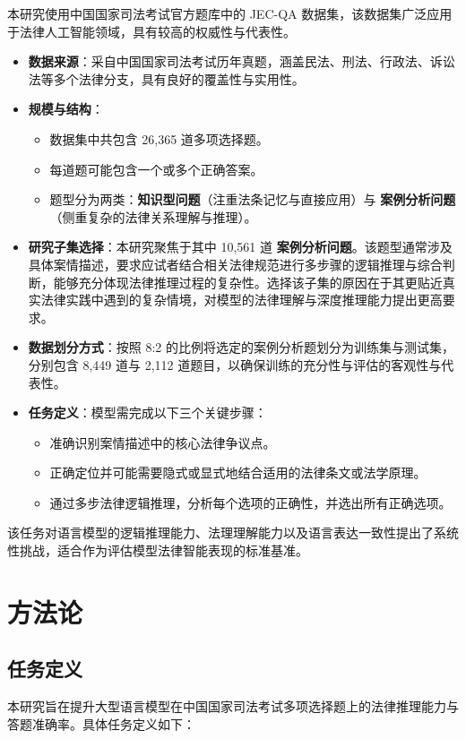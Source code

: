 \documentclass{pkuthesis}
\begin{document}
本研究使用中国国家司法考试官方题库中的 JEC-QA 数据集\cite{zhong2020jec}，该数据集广泛应用于法律人工智能领域，具有较高的权威性与代表性。

\begin{itemize}
\item \textbf{数据来源}：采自中国国家司法考试历年真题，涵盖民法、刑法、行政法、诉讼法等多个法律分支，具有良好的覆盖性与实用性。
\item \textbf{规模与结构}：
\begin{itemize}
\item 数据集中共包含 26,365 道多项选择题。
\item 每道题可能包含一个或多个正确答案。
\item 题型分为两类：\textbf{知识型问题}（注重法条记忆与直接应用）与 \textbf{案例分析问题}（侧重复杂的法律关系理解与推理）。
\end{itemize}

\item \textbf{研究子集选择}：本研究聚焦于其中 10,561 道 \textbf{案例分析问题}。该题型通常涉及具体案情描述，要求应试者结合相关法律规范进行多步骤的逻辑推理与综合判断，能够充分体现法律推理过程的复杂性。选择该子集的原因在于其更贴近真实法律实践中遇到的复杂情境，对模型的法律理解与深度推理能力提出更高要求。

\item \textbf{数据划分方式}：按照 8:2 的比例将选定的案例分析题划分为训练集与测试集，分别包含 8,449 道与 2,112 道题目，以确保训练的充分性与评估的客观性与代表性。

\item \textbf{任务定义}：模型需完成以下三个关键步骤：
\begin{itemize}
\item 准确识别案情描述中的核心法律争议点。
\item 正确定位并可能需要隐式或显式地结合适用的法律条文或法学原理。
\item 通过多步法律逻辑推理，分析每个选项的正确性，并选出所有正确选项。
\end{itemize}
\end{itemize}

该任务对语言模型的逻辑推理能力、法理理解能力以及语言表达一致性提出了系统性挑战，适合作为评估模型法律智能表现的标准基准。

\section{方法论}

\subsection{任务定义}
本研究旨在提升大型语言模型在中国国家司法考试多项选择题上的法律推理能力与答题准确率。具体任务定义如下：
\end{document}
